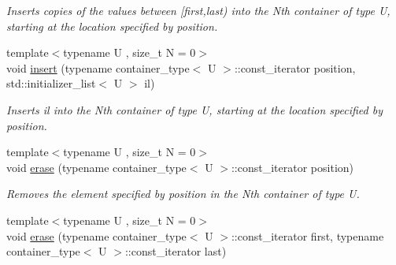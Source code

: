 \begin{DoxyCompactItemize}
\begin{DoxyCompactList}\small\item\em Inserts copies of the values between \mbox{[}first,last) into the Nth container of type U, starting at the location specified by position. \end{DoxyCompactList}\item 
\hypertarget{classheterogeneous_1_1heterovector_3_01_t_00_01_types_8_8_8_4_a4c0360a58de3869ed498e5bb76e1eccd}{}{\footnotesize template$<$typename U , size\+\_\+t N = 0$>$ }\\void \hyperlink{classheterogeneous_1_1heterovector_3_01_t_00_01_types_8_8_8_4_a4c0360a58de3869ed498e5bb76e1eccd}{insert} (typename container\+\_\+type$<$ U $>$\+::const\+\_\+iterator position, std\+::initializer\+\_\+list$<$ U $>$ il)\label{classheterogeneous_1_1heterovector_3_01_t_00_01_types_8_8_8_4_a4c0360a58de3869ed498e5bb76e1eccd}

\begin{DoxyCompactList}\small\item\em Inserts il into the Nth container of type U, starting at the location specified by position. \end{DoxyCompactList}\item 
\hypertarget{classheterogeneous_1_1heterovector_3_01_t_00_01_types_8_8_8_4_a78f5cd1de9254ac35082a24e440d37c2}{}{\footnotesize template$<$typename U , size\+\_\+t N = 0$>$ }\\void \hyperlink{classheterogeneous_1_1heterovector_3_01_t_00_01_types_8_8_8_4_a78f5cd1de9254ac35082a24e440d37c2}{erase} (typename container\+\_\+type$<$ U $>$\+::const\+\_\+iterator position)\label{classheterogeneous_1_1heterovector_3_01_t_00_01_types_8_8_8_4_a78f5cd1de9254ac35082a24e440d37c2}

\begin{DoxyCompactList}\small\item\em Removes the element specified by position in the Nth container of type U. \end{DoxyCompactList}\item 
\hypertarget{classheterogeneous_1_1heterovector_3_01_t_00_01_types_8_8_8_4_a1143b814f5e3207e2a4483c36eeb9a74}{}{\footnotesize template$<$typename U , size\+\_\+t N = 0$>$ }\\void \hyperlink{classheterogeneous_1_1heterovector_3_01_t_00_01_types_8_8_8_4_a1143b814f5e3207e2a4483c36eeb9a74}{erase} (typename container\+\_\+type$<$ U $>$\+::const\+\_\+iterator first, typename container\+\_\+type$<$ U $>$\+::const\+\_\+iterator last)\label{classheterogeneous_1_1heterovector_3_01_t_00_01_types_8_8_8_4_a1143b814f5e3207e2a4483c36eeb9a74}


\end{DoxyCompactItemize}
